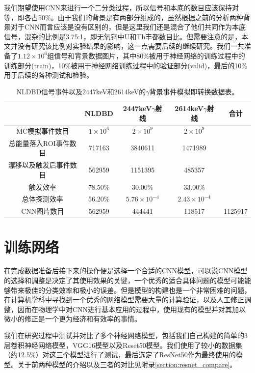 我们期望使用CNN来进行一个二分类过程，所以信号和本底的数目应该保持对等，即各占50\%。由于我们的背景是有两部分组成的，虽然根据之前的分析两种背景对于CNN而言应该是没有区别的，但是这里我们还是混合了他们共同作为本底信号，混杂的比例是3.75:1，即无氧铜中U和Th丰都数目比。但需要注意的是，本文并没有研究该比例对实验结果的影响，这一点需要后续的继续研究。我们一共准备了$1.12\times10^6$组信号和背景数据图片，其中80\%被用于神经网络的训练过程中的训练部分(train)，10\%被用于神经网络训练过程中的验证部分(valid)，最后的10\%用于后续的各种测试和检验。
        
\renewcommand\arraystretch{1.4}
\begin{table}
    \centering
    \begin{tabular*}{\textwidth}{@{\extracolsep{\fill}}ccccc}
        \hline
        \hline							
        	&	NLDBD	&	2447keV$\gamma$射线	&	2614keV$\gamma$射线	&	合计	\\
        \hline
        MC模拟事件数目	&	$1\times10^6$	&	$2\times10^9$	&	$2\times10^9$	&		\\
        总能量落入ROI事件数目	&	717163	&	3840611	&	1471989	&		\\
        漂移以及触发后事件数目	&	562959	&	1151395	&	485357	&		\\
        触发效率	&	78.50\%	&	30.00\%	&	33.00\%	&		\\
        总体探测效率	&	56.20\%	&	$5.76\times10^{-4}$	&	$2.43\times10^{-4}$	&		\\
        CNN图片数目	&	562959	&	444441	&	118517	&	1125917	\\
        \hline
        \hline
    \end{tabular*}
    \caption{NLDBD信号事件以及2447keV和2614keV的$\gamma$背景事件模拟即转换数据表。}
    \label{tab:convert}
  \end{table}

\section{训练网络}
\label{section:train}

在完成数据准备后接下来的操作便是选择一个合适的CNN模型，可以说CNN模型的选择和调整是决定了其使用效果的关键，一个优秀的适合具体问题的模型可能能够带来极佳的分类效率和极小的误差。但是模型的构建也是一个非常困难的问题，在计算机学科中寻找到一个优秀的网络模型需要大量的计算验证，以及人工修正调整，因而在物理学中对CNN进行基本应用的过程中，使用现有的模型并对其加以微小的修正是一个更为经济和有效率的事情。

我们在研究过程中测试并对比了多个神经网络模型，包括我们自己构建的简单的3层卷积神经网络模型，VGG16模型\supercite{simonyan2014very}以及Reset50模型\supercite{he2016deep}。我们使用了较小的数据集（约12.5\%）对这三个模型进行了测试，最后选定了ResNet50作为最终使用的模型。关于前两种模型的介绍以及三者的对比见附录\ref{section:resnet_compare}。

